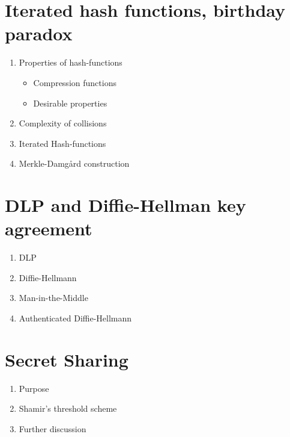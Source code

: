 \documentclass{article}
\begin{document}
\section{Iterated hash functions, birthday paradox}
\begin{enumerate}
\item Properties of hash-functions
  \begin{itemize}
  \item Compression functions
  \item Desirable properties
  \end{itemize}
\item Complexity of collisions
\item Iterated Hash-functions
\item Merkle-Damgård construction
\end{enumerate}
\clearpage

\section{DLP and Diffie-Hellman key agreement}
\begin{enumerate}
\item DLP
\item Diffie-Hellmann
\item Man-in-the-Middle
\item Authenticated Diffie-Hellmann
\end{enumerate}
\clearpage

\section{Secret Sharing}
\begin{enumerate}
\item Purpose
\item Shamir's threshold scheme
\item Further discussion
\end{enumerate}
\end{document}
